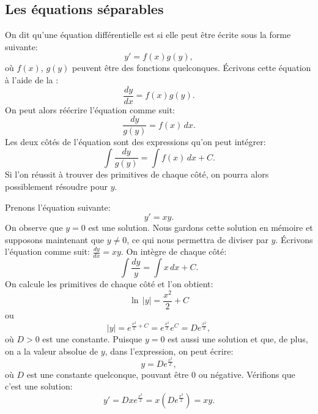 \subsection{Les équations séparables}

On dit qu'une équation différentielle est \emph{}
si elle peut être écrite sous la forme suivante:
\begin{equation*}
	y' = f(x)g(y),
\end{equation*}
où $f(x)$, $g(y)$ peuvent être des fonctions quelconques.
Écrivons cette équation à l'aide de la :
\begin{equation*}
	\frac{dy}{dx} = f(x)g(y) .
\end{equation*}
On peut alors réécrire l'équation comme suit:
\begin{equation*}
	\frac{dy}{g(y)} = f(x) \,dx .
\end{equation*}
Les deux côtés de l'équation sont des expressions qu'on peut intégrer:
\begin{equation*}
	\int \frac{dy}{g(y)} = \int f(x) \,dx + C .
\end{equation*}
Si l'on réussit à trouver des primitives de chaque côté, on pourra alors possiblement résoudre pour $y$.

\begin{example} \label{example:yprimeisxy}
	Prenons l'équation  suivante:
	\begin{equation*}
		y' = xy .
	\end{equation*}
	On observe que $y=0$ est une solution.  Nous gardons cette solution en mémoire et supposons maintenant que
	$y \not =0$, ce qui nous permettra de diviser par $y$.
	Écrivons l'équation comme suit: $\frac{dy}{dx} = xy$.  On intègre de chaque côté:
	\begin{equation*}
		\int \frac{dy}{y} = \int x\,dx + C .
	\end{equation*}
	On calcule les primitives de chaque côté et l'on obtient:
	\begin{equation*}
		\ln \, \lvert y\rvert = \frac{x^2}{2} + C
	\end{equation*}
	ou
	\begin{equation*}
		\lvert y \rvert = e^{\frac{x^2}{2} + C} = e^{\frac{x^2}{2}} e^C = D e^{\frac{x^2}{2}} ,
	\end{equation*}
	où $D > 0$ est une constante.  Puisque $y=0$ est aussi une solution et que, de plus, on a la valeur absolue de $y$, dans l'expression, on peut écrire:
	\begin{equation*}
		y = D e^{\frac{x^2}{2}} ,
	\end{equation*}
	où $D$ est une constante quelconque, pouvant être 0 ou négative.  Vérifions que c'est une solution:
	\begin{equation*}
		y' = D x e^{\frac{x^2}{2}} = x \left( D e^{\frac{x^2}{2}} \right) = xy .
	\end{equation*}
\end{example}

